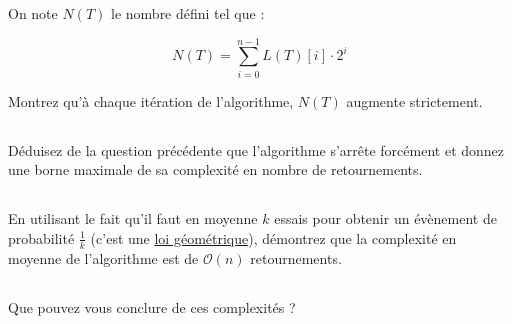 \documentclass
[12pt]
{article}
\begin{document}
On note $N(T)$ le nombre défini tel que : 

$$
N(T) = \sum_{i=0}^{n-1}L(T)[i]\cdot 2^{i}
$$

Montrez qu'à chaque itération de l'algorithme, $N(T)$ augmente strictement.

\subsection{}

Déduisez de la question précédente que l'algorithme s'arrête forcément et donnez une borne maximale de sa complexité en nombre de retournements.

\subsection{}

En utilisant le fait qu'il faut en moyenne $k$ essais pour obtenir un évènement de probabilité $\frac{1}{k}$ (c'est une \href{https://fr.wikipedia.org/wiki/Loi_g%C3%A9om%C3%A9trique}{loi géométrique}), démontrez que la complexité en moyenne de l'algorithme est de $\mathcal{O}(n)$ retournements.

\subsection{}

Que pouvez vous conclure de ces complexités ?
\end{document}
